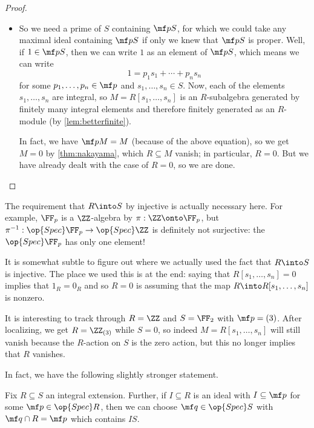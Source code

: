 \begin{proof}
\begin{itemize}
		\item So we need a prime of $S$ containing $\mf pS$, for which we could take any maximal ideal containing $\mf pS$ if only we knew that $\mf pS$ is proper. Well, if $1\in\mf pS$, then we can write $1$ as an element of $\mf pS$, which means we can write
		\[1=p_1s_1+\cdots+p_ns_n\]
		for some $p_1,\ldots,p_n\in\mf p$ and $s_1,\ldots,s_n\in S$. Now, each of the elements $s_1,\ldots,s_n$ are integral, so $M=R[s_1,\ldots,s_n]$ is an $R$-subalgebra generated by finitely many integral elements and therefore finitely generated as an $R$-module (by \autoref{lem:betterfinite}).
		
		In fact, we have $\mf pM=M$ (because of the above equation), so we get $M=0$ by \autoref{thm:nakayama}, which $R\subseteq M$ vanish; in particular, $R=0$. But we have already dealt with the case of $R=0$, so we are done.
		\qedhere
	\end{itemize}
\end{proof}
\begin{remark}[Nir]
	The requirement that $R\into S$ by injective is actually necessary here. For example, $\FF_p$ is a $\ZZ$-algebra by $\pi:\ZZ\onto\FF_p$, but $\pi^{-1}:\op{Spec}\FF_p\to\op{Spec}\ZZ$ is definitely not surjective: the $\op{Spec}\FF_p$ has only one element!
\end{remark}
\begin{remark}[Nir]
	It is somewhat subtle to figure out where we actually used the fact that $R\into S$ is injective. The place we used this is at the end: saying that $R[s_1,\ldots,s_n]=0$ implies that $1_R=0_R$ and so $R=0$ is assuming that the map $R\into R[s_1,\ldots,s_n]$ is nonzero.
	
	It is interesting to track through $R=\ZZ$ and $S=\FF_2$ with $\mf p=(3)$. After localizing, we get $R=\ZZ_{(3)}$ while $S=0$, so indeed $M=R[s_1,\ldots,s_n]$ will still vanish because the $R$-action on $S$ is the zero action, but this no longer implies that $R$ vanishes.
\end{remark}
In fact, we have the following slightly stronger statement.
\begin{corollary}
	Fix $R\subseteq S$ an integral extension. Further, if $I\subseteq R$ is an ideal with $I\subseteq\mf p$ for some $\mf p\in\op{Spec}R$, then we can choose $\mf q\in\op{Spec}S$ with $\mf q\cap R=\mf p$ which contains $IS$.
\end{corollary}
